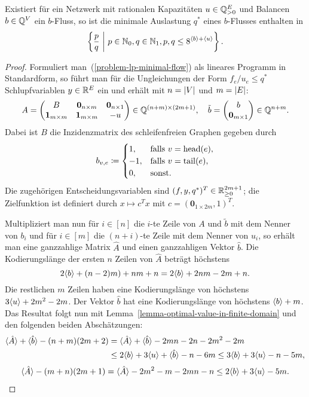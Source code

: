 \begin{corollary}\label{cor-minimal-congestion-limited}
	Existiert für ein Netzwerk mit rationalen Kapazitäten $u\in\mathbb{Q}_{>0}^E$ und Balancen $b\in\mathbb{Q}^V$ ein $b$-Fluss, so ist die minimale Auslastung $q^*$ eines $b$-Flusses enthalten in
	\[
	\left\{ \frac{p}{q} ~\middle|~ p\in\mathbb{N}_0, q\in\mathbb{N}_1, p,q \leq 8^{\langle b\rangle + \langle u\rangle } \right\}.
	\]
\end{corollary}
\begin{proof}
Formuliert man~(\ref{problem-lp-minimal-flow}) als lineares Programm in Standardform, so führt man für die Ungleichungen der Form $f_e/u_e \leq q^*$ Schlupfvariablen $y\in\mathbb{R}^E$ ein und erhält mit $n=\lvert V\rvert$ und $m=\lvert E\rvert$:
\newcommand{\nil}{\mathbf{0}}
\newcommand{\one}{\mathbf{1}}
\[
	A = \begin{pmatrix}
		B & \nil_{n\times m} & \nil_{n\times 1} \\
		\one_{m\times m} & \one_{m\times m} & -u
	\end{pmatrix} \in \Q^{(n+m) \times (2m+1)},~~~
	\tilde{b} = \begin{pmatrix}
		b \\
		\nil_{m\times 1}
	\end{pmatrix} \in \Q^{n+m}.
\]
Dabei ist $B$ die Inzidenzmatrix des schleifenfreien Graphen gegeben durch 
\[ 
	b_{v,e} \coloneq \begin{cases}
		1, & \text{falls $v = \operatorname{head}(e)$}, \\
		-1, & \text{falls $v = \operatorname{tail}(e)$},\\
		0, & \text{sonst.}
	\end{cases}
\]
 Die zugehörigen Entscheidungsvariablen sind $(f, y, q^*)^T\in\mathbb{R}_{\geq 0}^{2m+1}$; die Zielfunktion ist definiert durch $x\mapsto c^T x$ mit $c = (\nil_{1\times 2m}, 1)^T$.
 
Multipliziert man nun für $i\in [n]$ die $i$-te Zeile von $A$ und $\tilde{b}$ mit dem Nenner von $b_i$ und für $i\in [m]$ die $(n+i)$-te Zeile mit dem Nenner von $u_i$, so erhält man eine ganzzahlige Matrix $\hat{A}$ und einen ganzzahligen Vektor $\hat{b}$.
Die Kodierungslänge der ersten $n$ Zeilen von $\hat{A}$ beträgt höchstens \[ 2\langle b\rangle + (n-2)m) + nm + n = 2\langle b\rangle + 2nm -2m + n.
\]
Die restlichen $m$ Zeilen haben eine Kodierungslänge von höchstens $3\langle u\rangle + 2m^2 - 2m$.
Der Vektor $\hat{b}$ hat eine Kodierungslänge von höchstens $\langle b\rangle + m$.
Das Resultat folgt nun mit Lemma~\ref{lemma-optimal-value-in-finite-domain} und den folgenden beiden Abschätzungen:
{\setlength{\abovedisplayskip}{9pt}%
	\setlength{\belowdisplayskip}{-2pt}%
\begin{align*}
\langle\hat{A}\rangle + \langle\hat{b}\rangle - (n+m)(2m+2) &= \langle\hat{A}\rangle + \langle\hat{b}\rangle - 2mn - 2n - 2m^2 - 2m\\
&\leq 2 \langle b\rangle + 3\langle u\rangle + \langle\hat{b}\rangle - n - 6m \leq 3\langle b\rangle + 3\langle u\rangle -n-5m,
\end{align*}
\begin{align*}
\langle\hat{A}\rangle - (m+n)(2m + 1) = \langle\hat{A}\rangle - 2m^2 - m - 2mn - n \leq 2\langle b\rangle + 3\langle u\rangle - 5m.
\end{align*}
}
\end{proof}

